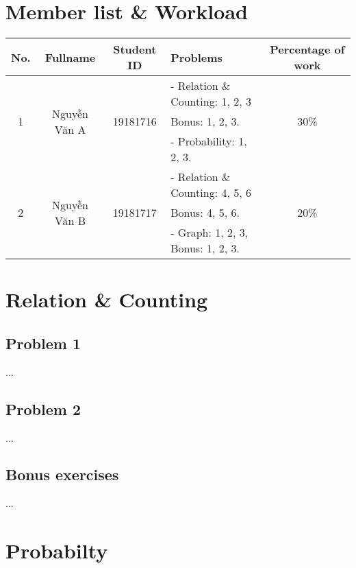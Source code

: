 \documentclass[a4paper]{article}
\begin{document}

\newpage
\tableofcontents
\newpage


\section{Member list \& Workload}

\begin{center}
\begin{tabular}{|c|c|c|l|c|}
\hline
\textbf{No.} & \textbf{Fullname} & \textbf{Student ID} & \textbf{Problems} & \textbf{Percentage of work}\\
\hline 
\multirow{3}{*}{1} & \multirow{3}{*}{Nguyễn Văn A} & \multirow{3}{*}{19181716} & - Relation \& Counting: 1, 2, 3& \multirow{3}{*}{30\%}\\
 & &  & Bonus: 1, 2, 3. &\\
 & &  & - Probability: 1, 2, 3. &\\
\hline 
\multirow{3}{*}{2} & \multirow{3}{*}{Nguyễn Văn B} & \multirow{3}{*}{19181717} & - Relation \& Counting: 4, 5, 6& \multirow{3}{*}{20\%}\\
 & &  & Bonus: 4, 5, 6. &\\
 & &  & - Graph: 1, 2, 3, Bonus: 1, 2, 3. &\\
\hline
\end{tabular}
\end{center}

\section{Relation \& Counting}
	\subsection{Problem 1}
	...
	
	\subsection{Problem 2}
	...

	\subsection{Bonus exercises}
	...

\section{Probabilty}
\end{document}
